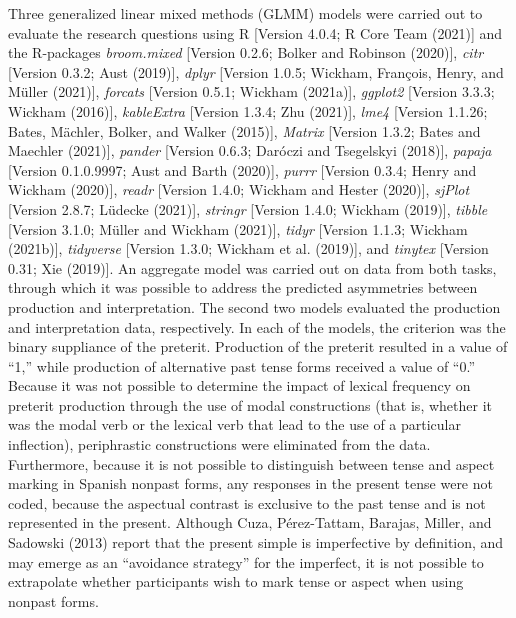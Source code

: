 \documentclass[
  english,
  man]{apa6}
\begin{document}
Three generalized linear mixed methods (GLMM) models were carried out to evaluate the research questions using R {[}Version 4.0.4; R Core Team (2021){]} and the R-packages \emph{broom.mixed} {[}Version 0.2.6; Bolker and Robinson (2020){]}, \emph{citr} {[}Version 0.3.2; Aust (2019){]}, \emph{dplyr} {[}Version 1.0.5; Wickham, François, Henry, and Müller (2021){]}, \emph{forcats} {[}Version 0.5.1; Wickham (2021a){]}, \emph{ggplot2} {[}Version 3.3.3; Wickham (2016){]}, \emph{kableExtra} {[}Version 1.3.4; Zhu (2021){]}, \emph{lme4} {[}Version 1.1.26; Bates, Mächler, Bolker, and Walker (2015){]}, \emph{Matrix} {[}Version 1.3.2; Bates and Maechler (2021){]}, \emph{pander} {[}Version 0.6.3; Daróczi and Tsegelskyi (2018){]}, \emph{papaja} {[}Version 0.1.0.9997; Aust and Barth (2020){]}, \emph{purrr} {[}Version 0.3.4; Henry and Wickham (2020){]}, \emph{readr} {[}Version 1.4.0; Wickham and Hester (2020){]}, \emph{sjPlot} {[}Version 2.8.7; Lüdecke (2021){]}, \emph{stringr} {[}Version 1.4.0; Wickham (2019){]}, \emph{tibble} {[}Version 3.1.0; Müller and Wickham (2021){]}, \emph{tidyr} {[}Version 1.1.3; Wickham (2021b){]}, \emph{tidyverse} {[}Version 1.3.0; Wickham et al. (2019){]}, and \emph{tinytex} {[}Version 0.31; Xie (2019){]}. An aggregate model was carried out on data from both tasks, through which it was possible to address the predicted asymmetries between production and interpretation. The second two models evaluated the production and interpretation data, respectively. In each of the models, the criterion was the binary suppliance of the preterit. Production of the preterit resulted in a value of ``1,'' while production of alternative past tense forms received a value of ``0.'' Because it was not possible to determine the impact of lexical frequency on preterit production through the use of modal constructions (that is, whether it was the modal verb or the lexical verb that lead to the use of a particular inflection), periphrastic constructions were eliminated from the data. Furthermore, because it is not possible to distinguish between tense and aspect marking in Spanish nonpast forms, any responses in the present tense were not coded, because the aspectual contrast is exclusive to the past tense and is not represented in the present. Although Cuza, Pérez-Tattam, Barajas, Miller, and Sadowski (2013) report that the present simple is imperfective by definition, and may emerge as an ``avoidance strategy'' for the imperfect, it is not possible to extrapolate whether participants wish to mark tense or aspect when using nonpast forms.
\end{document}
